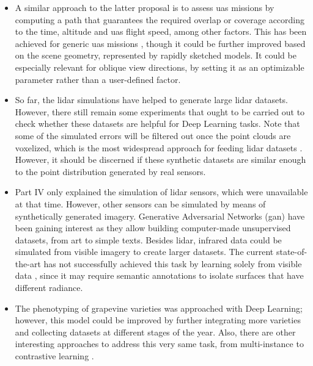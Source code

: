 \begin{itemize}
    \item A similar approach to the latter proposal is to assess \acrshort{uas} missions by computing a path that guarantees the required overlap or coverage according to the time, altitude and \acrshort{uas} flight speed, among other factors. This has been achieved for generic \acrshort{uas} missions \cite{pessacg_simplifying_2022}, though it could be further improved based on the scene geometry, represented by rapidly sketched models. It could be especially relevant for oblique view directions, by setting it as an optimizable parameter rather than a user-defined factor. 
    \item So far, the \acrshort{lidar} simulations have helped to generate large \acrshort{lidar} datasets. However, there still remain some experiments that ought to be carried out to check whether these datasets are helpful for Deep Learning tasks. Note that some of the simulated errors will be filtered out once the point clouds are voxelized, which is the most widespread approach for feeding \acrshort{lidar} datasets \cite{hackel_semantic3d_2017, behley_towards_2021}. However, it should be discerned if these synthetic datasets are similar enough to the point distribution generated by real sensors. 
    \item Part IV only explained the simulation of \acrshort{lidar} sensors, which were unavailable at that time. However, other sensors can be simulated by means of synthetically generated imagery. Generative Adversarial Networks (\acrshort{gan}) have been gaining interest as they allow building computer-made unsupervised datasets, from art to simple texts. Besides \acrshort{lidar}, infrared data could be simulated from visible imagery to create larger datasets. The current state-of-the-art has not successfully achieved this task by learning solely from visible data \cite{li_multi-branch_2019, li_i-gans_2021, kniaz_thermalgan_2019, ozkanoglu_infragan_2022, yi_cycle_2023}, since it may require semantic annotations to isolate surfaces that have different radiance. 
    \item The phenotyping of grapevine varieties was approached with Deep Learning; however, this model could be improved by further integrating more varieties and collecting datasets at different stages of the year. Also, there are other interesting approaches to address this very same task, from multi-instance \cite{meerdink_multitarget_2022} to contrastive learning \cite{guan_spatial-spectral_2022}. 
\end{itemize}


